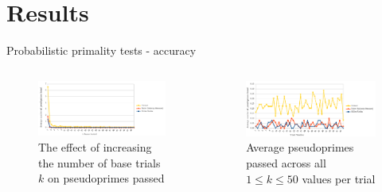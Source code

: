 \documentclass[pdf,aspectratio=169]{beamer}
\begin{document}
\section{Results}
\begin{frame}{Probabilistic primality tests - accuracy}
    \begin{columns}[t, onlytextwidth]
        \begin{column}{0.48\textwidth}
            \begin{figure}
                \setcounter{figure}{0}
                \caption{The effect of increasing the number of base trials $k$ on pseudoprimes passed}
                \centering
                \includegraphics[width=\textwidth]{pprimes_v_bases}
            \end{figure}
        \end{column}
        \begin{column}{0.48\textwidth}
            \begin{figure}
                \setcounter{figure}{1}
                \caption{Average pseudoprimes passed across all $1 \leq k \leq 50$ values per trial}
                \centering
                \includegraphics[width=\textwidth]{pprimes_v_trial}
            \end{figure}
        \end{column}
    \end{columns}
    \begin{outline}
        \pause
    \end{outline}
\end{frame}
\end{document}
